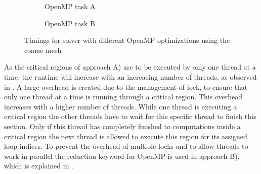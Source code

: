 \begin{figure}[h!]
	\centering
	\begin{subfigure}[h!]{.49\textwidth}
		\centering
		\caption{\label{fig::OpenMPA} OpenMP task A}
	\end{subfigure}
	\hfill
	\begin{subfigure}[h!]{.49\textwidth}
		\centering
		\caption{\label{fig::OpenMPB} OpenMP task B}
	\end{subfigure}
	\caption{\label{fig::OpenMP1} Timings for solver with different OpenMP optimizations using the coarse mesh}
\end{figure}

As the critical regions of approach A) are to be executed by only one thread at a time, the runtime will increase with an increasing number of threads, as observed in . A large overhead is created due to the management of lock, to ensure that only one thread at a time is running through a critical region. This overhead increases with a higher number of threads. While one thread is executing a critical region the other threads have to wait for this specific thread to finish this section. Only if this thread has completely finished to computations inside a critical region the next thread is allowed to execute this region for its assigned loop indices. To prevent the overhead of multiple locks and to allow threads to work in parallel the reduction keyword for OpenMP is used in approach B), which is explained in . 

